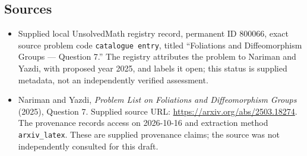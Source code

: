 \documentclass[11pt]{article}
\begin{document}
\subsection{Sources}
\begin{itemize}
\item Supplied local UnsolvedMath registry record, permanent ID \(800066\), exact source problem code \texttt{catalogue entry}, titled ``Foliations and Diffeomorphism Groups --- Question 7.'' The registry attributes the problem to Nariman and Yazdi, with proposed year 2025, and labels it open; this status is supplied metadata, not an independently verified assessment.
\item Nariman and Yazdi, \textit{Problem List on Foliations and Diffeomorphism Groups} (2025), Question 7. Supplied source URL: \url{https://arxiv.org/abs/2503.18274}. The provenance records access on 2026-10-16 and extraction method \texttt{arxiv\_latex}. These are supplied provenance claims; the source was not independently consulted for this draft.
\end{itemize}
\end{document}
